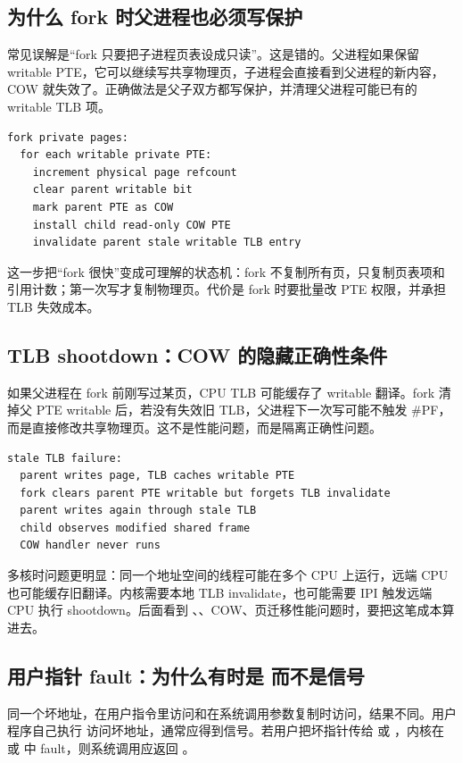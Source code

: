 \subsection{为什么 fork 时父进程也必须写保护}

常见误解是“fork 只要把子进程页表设成只读”。这是错的。父进程如果保留 writable PTE，它可以继续写共享物理页，子进程会直接看到父进程的新内容，COW 就失效了。正确做法是父子双方都写保护，并清理父进程可能已有的 writable TLB 项。

\begin{lstlisting}
fork private pages:
  for each writable private PTE:
    increment physical page refcount
    clear parent writable bit
    mark parent PTE as COW
    install child read-only COW PTE
    invalidate parent stale writable TLB entry
\end{lstlisting}

这一步把“fork 很快”变成可理解的状态机：fork 不复制所有页，只复制页表项和引用计数；第一次写才复制物理页。代价是 fork 时要批量改 PTE 权限，并承担 TLB 失效成本。

\subsection{TLB shootdown：COW 的隐藏正确性条件}

如果父进程在 fork 前刚写过某页，CPU TLB 可能缓存了 writable 翻译。fork 清掉父 PTE writable 后，若没有失效旧 TLB，父进程下一次写可能不触发 \#PF，而是直接修改共享物理页。这不是性能问题，而是隔离正确性问题。

\begin{lstlisting}
stale TLB failure:
  parent writes page, TLB caches writable PTE
  fork clears parent PTE writable but forgets TLB invalidate
  parent writes again through stale TLB
  child observes modified shared frame
  COW handler never runs
\end{lstlisting}

多核时问题更明显：同一个地址空间的线程可能在多个 CPU 上运行，远端 CPU 也可能缓存旧翻译。内核需要本地 TLB invalidate，也可能需要 IPI 触发远端 CPU 执行 shootdown。后面看到 、、COW、页迁移性能问题时，要把这笔成本算进去。

\subsection{用户指针 fault：为什么有时是  而不是信号}

同一个坏地址，在用户指令里访问和在系统调用参数复制时访问，结果不同。用户程序自己执行  访问坏地址，通常应得到信号。若用户把坏指针传给  或 ，内核在  或  中 fault，则系统调用应返回 。

